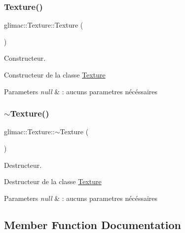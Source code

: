 \subsubsection{\texorpdfstring{Texture()}{Texture()}}
{\footnotesize\ttfamily glimac\+::\+Texture\+::\+Texture (\begin{DoxyParamCaption}{ }\end{DoxyParamCaption})}



Constructeur. 

Constructeur de la classe \hyperlink{classglimac_1_1Texture}{Texture}


\begin{DoxyParams}{Parameters}
{\em null} & \+: aucuns parametres nécéssaires \\
\hline
\end{DoxyParams}
\mbox{\label{classglimac_1_1Texture_ad5c3fdead4adfd00168fd1ef7af1ee0b}} 
\subsubsection{\texorpdfstring{$\sim$\+Texture()}{~Texture()}}
{\footnotesize\ttfamily glimac\+::\+Texture\+::$\sim$\+Texture (\begin{DoxyParamCaption}{ }\end{DoxyParamCaption})}



Destructeur. 

Destructeur de la classe \hyperlink{classglimac_1_1Texture}{Texture}


\begin{DoxyParams}{Parameters}
{\em null} & \+: aucuns parametres nécéssaires \\
\hline
\end{DoxyParams}


\subsection{Member Function Documentation}
\mbox{\label{classglimac_1_1Texture_a3b8c146aace8d5ebdca71f08f470283a}} 
